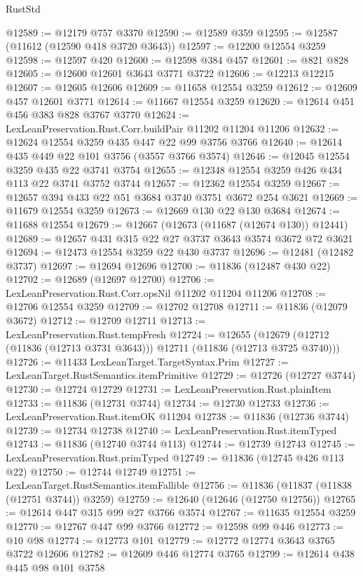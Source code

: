 \begin{lexlean}{RustStd}
\begin{coremodule}
@12589 := @12179 @757 @3370
@12590 := @12589 @359
@12595 := @12587 (@11612 (@12590 @418 @3720 @3643))
@12597 := @12200 @12554 @3259
@12598 := @12597 @420
@12600 := @12598 @384 @457
@12601 := @821 @828
@12605 := @12600 @12601 @3643 @3771 @3722
@12606 := @12213 @12215
@12607 := @12605 @12606
@12609 := @11658 @12554 @3259
@12612 := @12609 @457 @12601 @3771
@12614 := @11667 @12554 @3259
@12620 := @12614 @451 @456 @383 @828 @3767 @3770
@12624 := LexLeanPreservation.Rust.Corr.buildPair @11202 @11204 @11206
@12632 := @12624 @12554 @3259 @435 @447 @22 @99 @3756 @3766
@12640 := @12614 @435 @449 @22 @101 @3756 (@3557 @3766 @3574)
@12646 := @12045 @12554 @3259 @435 @22 @3741 @3754
@12655 := @12348 @12554 @3259 @426 @434 @113 @22 @3741 @3752 @3744
@12657 := @12362 @12554 @3259
@12667 := @12657 @394 @433 @22 @51 @3684 @3740 @3751 @3672 @254 @3621
@12669 := @11679 @12554 @3259
@12673 := @12669 @130 @22 @130 @3684
@12674 := @11688 @12554
@12679 := @12667 (@12673 (@11687 (@12674 @130)) @12441)
@12689 := @12657 @431 @315 @22 @27 @3737 @3643 @3574 @3672 @72 @3621
@12694 := @12473 @12554 @3259 @22 @430 @3737
@12696 := @12481 (@12482 @3737)
@12697 := @12694 @12696
@12700 := @11836 (@12487 @430 @22)
@12702 := @12689 (@12697 @12700)
@12706 := LexLeanPreservation.Rust.Corr.opsNil @11202 @11204 @11206
@12708 := @12706 @12554 @3259
@12709 := @12702 @12708
@12711 := @11836 (@12079 @3672)
@12712 := @12709 @12711
@12713 := LexLeanPreservation.Rust.tempFresh
@12724 := @12655
    (@12679 (@12712 (@11836 (@12713 @3731 @3643))) @12711 (@11836 (@12713 @3725 @3740)))
@12726 := @11433 LexLeanTarget.TargetSyntax.Prim
@12727 := LexLeanTarget.RustSemantics.itemPrimitive
@12729 := @12726 (@12727 @3744)
@12730 := @12724 @12729
@12731 := LexLeanPreservation.Rust.plainItem
@12733 := @11836 (@12731 @3744)
@12734 := @12730 @12733
@12736 := LexLeanPreservation.Rust.itemOK @11204
@12738 := @11836 (@12736 @3744)
@12739 := @12734 @12738
@12740 := LexLeanPreservation.Rust.itemTyped
@12743 := @11836 (@12740 @3744 @113)
@12744 := @12739 @12743
@12745 := LexLeanPreservation.Rust.primTyped
@12749 := @11836 (@12745 @426 @113 @22)
@12750 := @12744 @12749
@12751 := LexLeanTarget.RustSemantics.itemFallible
@12756 := @11836 (@11837 (@11838 (@12751 @3744)) @3259)
@12759 := @12640 (@12646 (@12750 @12756))
@12765 := @12614 @447 @315 @99 @27 @3766 @3574
@12767 := @11635 @12554 @3259
@12770 := @12767 @447 @99 @3766
@12772 := @12598 @99 @446
@12773 := @10 @98
@12774 := @12773 @101
@12779 := @12772 @12774 @3643 @3765 @3722 @12606
@12782 := @12609 @446 @12774 @3765
@12799 := @12614
    @438
    @445
    @98
    @101
    @3758

\end{coremodule}
\end{lexlean}
